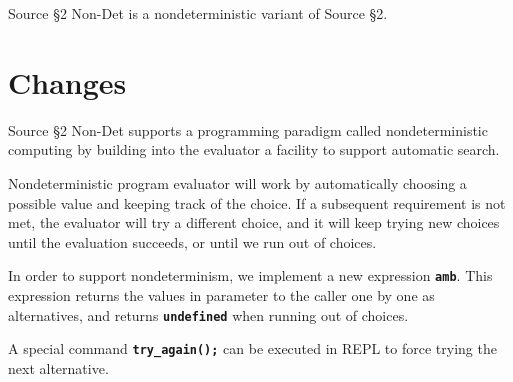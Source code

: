 





Source \S 2 Non-Det is a nondeterministic variant of Source \S 2.

\section*{Changes}


Source \S 2 Non-Det supports a programming paradigm called nondeterministic computing by building into the evaluator a facility to support automatic search. \newline

Nondeterministic program evaluator will work by automatically choosing a possible value and keeping track of the choice. If a subsequent requirement is not met, the evaluator will try a different choice, and it will keep trying new choices until the evaluation succeeds, or until we run out of choices.\newline

In order to support nondeterminism, we implement a new expression \textbf{\texttt{amb}}.
This expression returns the values in parameter to the caller one by one as alternatives,
and returns \textbf{\texttt{undefined}} when running out of choices.\newline

A special command \textbf{\texttt{try\_again();}} can be executed in REPL to force trying the next alternative.\newline




\newpage



\newpage





















\newpage



    
